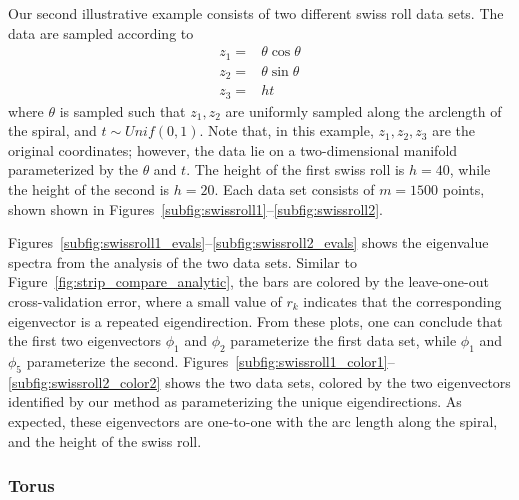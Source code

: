 \documentclass[preprint]{elsarticle}
\begin{document}
Our second illustrative example consists of two different swiss roll data sets.
%
The data are sampled according to
\begin{equation}
\begin{aligned}
z_1 =& \theta \cos \theta \\
z_2 =& \theta \sin \theta \\
z_3 =& h t
\end{aligned}
\end{equation}
%
where $\theta$ is sampled such that $z_1, z_2$ are uniformly sampled along the arclength of the spiral, and $t \sim Unif(0,1)$. 
%
Note that, in this example, $z_1, z_2, z_3$ are the original coordinates; however, the data lie on a two-dimensional manifold parameterized by the $\theta$ and $t$. 
%
The height of the first swiss roll is $h = 40$, while the height of the second is $h = 20$. 
%
Each data set consists of $m=1500$ points, shown shown in Figures~\ref{subfig:swissroll1}--\ref{subfig:swissroll2}.
%

Figures~\ref{subfig:swissroll1_evals}--\ref{subfig:swissroll2_evals} shows the eigenvalue spectra from the analysis of the two data sets.
%
Similar to Figure~\ref{fig:strip_compare_analytic}, the bars are colored by the leave-one-out cross-validation error, where a small value of $r_k$ indicates that the corresponding eigenvector is a repeated eigendirection. 
%
From these plots, one can conclude that the first two eigenvectors $\phi_1$ and $\phi_2$ parameterize the first data set, while $\phi_1$ and $\phi_5$ parameterize the second. 
%
Figures~\ref{subfig:swissroll1_color1}--\ref{subfig:swissroll2_color2} shows the two data sets, colored by the two eigenvectors identified by our method as parameterizing the unique eigendirections. 
%
As expected, these eigenvectors are one-to-one with the arc length along the spiral, and the height of the swiss roll. 

\subsubsection{Torus}
\end{document}
